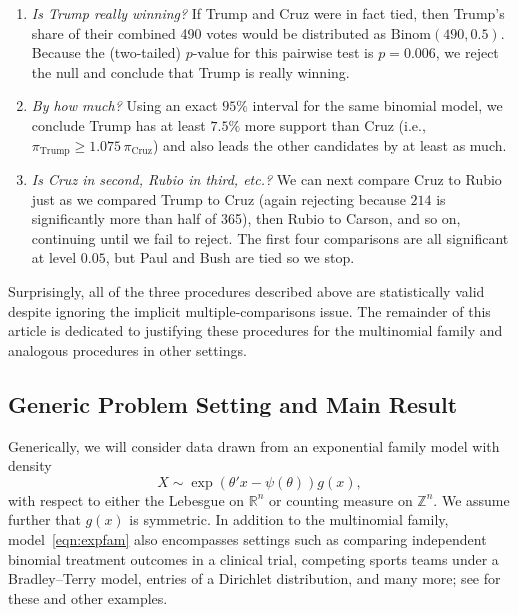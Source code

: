 \documentclass[11pt]{article}
\newcommand{\RR}{\mathbb{R}}
\newcommand{\ZZ}{\mathbb{Z}}
\begin{document}
\begin{enumerate}
\item {\em Is Trump really winning?} If Trump and Cruz were in fact tied, then Trump's share of their combined 490 votes would be distributed as $\text{Binom}\left(490, 0.5\right)$. Because the (two-tailed) $p$-value for this pairwise test is $p = 0.006$, we reject the null and conclude that Trump is really winning.

\item {\em By how much?} Using an exact $95\%$ interval for the same binomial model, we conclude Trump has at least $7.5\%$ more support than Cruz (i.e., $\pi_{\text{Trump}} \ge 1.075 \,\pi_{\text{Cruz}}$) and also leads the other candidates by at least as much.

\item {\em Is Cruz in second, Rubio in third, etc.?} We can next compare Cruz to Rubio just as we compared Trump to Cruz (again rejecting because $214$ is significantly more than half of 365), then Rubio to Carson, and so on, continuing until we fail to reject. The first four comparisons are all significant at level $0.05$, but Paul and Bush are tied so we stop.
\end{enumerate}

Surprisingly, all of the three procedures described above are statistically valid despite ignoring the implicit multiple-comparisons issue. The remainder of this article is dedicated to justifying these procedures for the multinomial family and analogous procedures in other settings.

\subsection{Generic Problem Setting and Main Result}
\label{sec:probset}

Generically, we will consider data drawn from an exponential family model with density
\begin{equation}
X \sim \exp\left(\theta'x - \psi\left(\theta\right)\right) g\left(x\right),
\tag{*}
\label{eqn:expfam}
\end{equation}
with respect to either the Lebesgue on $\RR^n$ or counting measure on $\ZZ^n$. We assume further that $g\left(x\right)$ is symmetric. In addition to the multinomial family, model~\eqref{eqn:expfam} also encompasses settings such as comparing independent binomial treatment outcomes in a clinical trial, competing sports teams under a Bradley--Terry model, entries of a Dirichlet distribution, and many more; see  for these and other examples.
\end{document}

